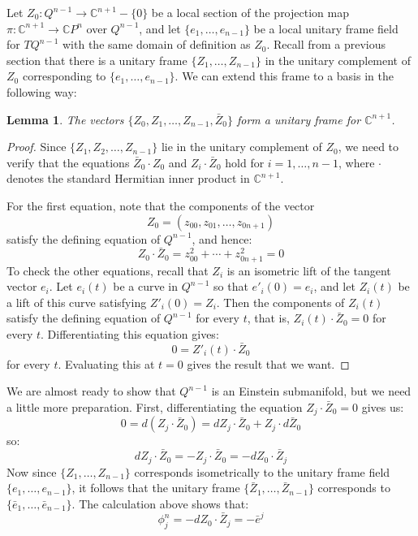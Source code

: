 \documentclass[11pt]{amsart}
\newtheorem{lem}[subsection]{Lemma}
\theoremstyle{definition}
\def \CP{ \mathbb{C}P }
\def \C{ \mathbb{C} }
\begin{document}
Let $Z_0 : Q^{n-1} \rightarrow \C^{n+1} - \{0\}$ be a local section of the projection map $\pi: \C^{n+1} \rightarrow \CP^n$ over $Q^{n-1}$, and let $\{ e_1, \ldots, e_{n-1} \}$ be a local unitary frame field for $TQ^{n-1}$ with the same domain of definition as $Z_0$.  Recall from a previous section that there is a unitary frame $\{ Z_1, \ldots, Z_{n-1} \}$ in the unitary complement of $Z_0$ corresponding to $\{ e_1, \ldots, e_{n-1} \}$.  We can extend this frame to a basis in the following way:

\begin{lem} The vectors $\{ Z_0, Z_1, \ldots, Z_{n-1}, \bar{Z}_0 \}$ form a unitary frame for $\C^{n+1}$.
\end{lem}

\begin{proof}  Since $\{ Z_1, Z_2, \ldots, Z_{n-1} \}$ lie in the unitary complement of $Z_0$, we need to verify that the equations $\bar{Z}_0 \cdot Z_0$ and $Z_i \cdot \bar{Z}_0$ hold for $i=1, \ldots, n-1$, where $\cdot$ denotes the standard Hermitian inner product in $\C^{n+1}$.

For the first equation, note that the components of the vector 
%
$$Z_0 = (z_{00}, z_{01}, \ldots, z_{0 n+1 })$$
%
satisfy the defining equation of $Q^{n-1}$, and hence:
%
$$ Z_0 \cdot \bar{Z}_0 = z_{00}^2 + \cdots + z_{0 n+1}^2 = 0 $$
%
To check the other equations, recall that $Z_i$ is an isometric lift of the tangent vector $e_i$.  Let $e_i(t)$ be a curve in $Q^{n-1}$ so that $e'_i(0) = e_i$, and let $Z_i(t)$ be a lift of this curve satisfying $Z'_i(0) = Z_i$.  Then the components of $Z_i(t)$ satisfy the defining equation of $Q^{n-1}$ for every $t$, that is, $Z_i(t) \cdot \bar{Z}_0 = 0$ for every $t$.  Differentiating this equation gives:
%
$$ 0 = Z'_i(t) \cdot \bar{Z}_0 $$
%
for every $t$.  Evaluating this at $t=0$ gives the result that we want.
\end{proof}

We are almost ready to show that $Q^{n-1}$ is an Einstein submanifold, but we need a little more preparation.  First, differentiating the equation $Z_j \cdot \bar{Z}_0 = 0$ gives us:
%
$$ 0 = d( Z_j \cdot \bar{Z}_0 ) = d Z_j \cdot \bar{Z}_0 + Z_j \cdot d \bar{Z}_0 $$
%
so:
%
$$ d Z_j \cdot \bar{Z}_0 = - Z_j \cdot \bar{Z}_0 = - d Z_0 \cdot \bar{Z}_j $$
%
Now since $\{ Z_1, \ldots, Z_{n-1 } \}$ corresponds isometrically to the unitary frame field $\{ e_1, \ldots, e_{n-1} \}$, it follows that the unitary frame $\{ \bar{Z}_1, \ldots, \bar{Z}_{n-1} \}$ corresponds to $\{ \bar{e}_1, \ldots, \bar{e}_{n-1} \}$.  The calculation above shows that:
%
$$ \phi^{n}_j = - d Z_0 \cdot \bar{Z}_j = - \bar{e}^j $$ 
\end{document}

